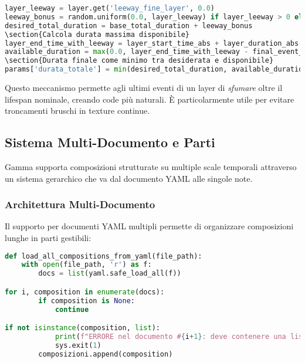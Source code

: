 \begin{lstlisting}[language=Python]
layer_leeway = layer.get('leeway_fine_layer', 0.0)
leeway_bonus = random.uniform(0.0, layer_leeway) if layer_leeway > 0 else 0.0
desired_total_duration = base_total_duration + leeway_bonus
\section{Calcola durata massima disponibile}
layer_end_time_with_leeway = layer_start_time_abs + layer_duration_abs + layer_leeway
available_duration = max(0.0, layer_end_time_with_leeway - final_event_time)
\section{Durata finale come minimo tra desiderata e disponibile}
params['durata_totale'] = min(desired_total_duration, available_duration)
\end{lstlisting}

Questo meccanismo permette agli ultimi eventi di un layer di \textit{sfumare} oltre il lifespan nominale, creando code più naturali. È particolarmente utile per evitare troncamenti bruschi in texture continue.
\subsection{Sistema Multi-Documento e Parti}
Gamma supporta composizioni strutturate su multiple scale temporali attraverso un sistema gerarchico che va dal documento YAML alle singole note.
\subsubsection{Architettura Multi-Documento}
Il supporto per documenti YAML multipli permette di organizzare composizioni lunghe in parti gestibili:

\begin{lstlisting}[language=Python]
def load_all_compositions_from_yaml(file_path):
    with open(file_path, 'r') as f:
        docs = list(yaml.safe_load_all(f))

for i, composition in enumerate(docs):
        if composition is None: 
            continue

if not isinstance(composition, list):
            print(f"ERRORE nel documento #{i+1}: deve contenere una lista di sezioni.")
            sys.exit(1)
        composizioni.append(composition)
\end{lstlisting}

